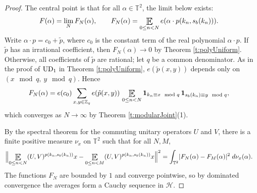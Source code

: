 \begin{proof} 
The central point is that for all $\alpha \in  \mathbb T ^2  $, the limit below exists: 
\begin{align}
    F(\alpha)=\lim_N  F_N(\alpha), \qquad F_N(\alpha)=\Expectation_{0\leq n<N} e(\alpha \cdot  p(k_n, s_b(k_n) ) ) . 
\end{align}
Write $\alpha\cdot p=c_0+\tilde p$, where $c_0$ is the constant term of the real polynomial $\alpha\cdot p$. 
If $\tilde p$ has an irrational coefficient, then $F_N(\alpha)\to0$ by Theorem \ref{t:polyUniform}. 
Otherwise, all coefficients of $\tilde p$ are rational; let $q$ be a common denominator. 
As in the proof of $\textup{UD}_1$ in Theorem \ref{t:polyUniform}, $e(\tilde p(x,y))$ depends only on $(x\mod q,\ y\mod q)$. 
Hence 
\begin{equation}
F_N(\alpha)=e(c_0)\sum_{x,y\in\mathbb{Z}_q}e(\tilde p(x,y))\,\Expectation_{0\leq n<N}\mathbf{1}_{k_n\equiv x\mod q}\,\mathbf{1}_{s_b(k_n)\equiv y\mod q}, 
\end{equation}
which converges as $N\to\infty$ by Theorem \ref{t:modularJoint}(1). 

By the spectral theorem for the commuting unitary operators $U$ and $V$, there is a finite positive measure $\nu_x$ on $\mathbb{T}^2$ such that 
for all $N,M$, 
\begin{equation}
\Bigl\lVert \Expectation_{0\leq n<N}(U,V) ^{p (k_n, s_b(k_n))}  x-\Expectation_{0\leq n<M}(U,V) ^{p (k_n, s_b(k_n))}  x\Bigr\rVert^2
=\int_{\mathbb{T}^2}\lvert F_N(\alpha)-F_M(\alpha)\rvert^2\;d\nu_x(\alpha). 
\end{equation}
The functions $F_N$ are bounded by $1$ and converge pointwise, so by dominated convergence the averages form a Cauchy sequence in $\mathcal H$. 
\end{proof}


 










